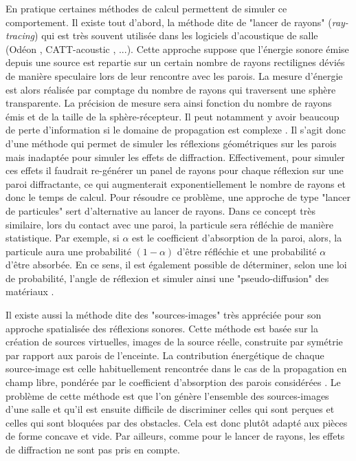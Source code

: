 En pratique certaines méthodes de calcul permettent de simuler ce comportement. Il existe tout d'abord, la méthode dite de "lancer de rayons" (\textit{ray-tracing})\cite[p.449-468]{raytracing} qui est très souvent utilisée dans les logiciels d'acoustique de salle (Odéon \cite[page web]{odeon}, CATT-acoustic \cite[page web]{catt}, ...). Cette approche suppose que l’énergie sonore émise depuis une source est repartie sur un certain nombre de rayons rectilignes déviés de manière \gls{speculaire} lors de leur rencontre avec les parois. La mesure d'énergie est alors réalisée par comptage du nombre de rayons qui traversent une sphère transparente. La précision de mesure sera ainsi fonction du nombre de rayons émis et de la taille de la sphère-récepteur. Il peut notamment y avoir beaucoup de perte d'information si le domaine de propagation est complexe \cite[p. 60]{picaut}. Il s'agit donc d'une méthode qui permet de simuler les réflexions géométriques sur les parois mais inadaptée pour simuler les effets de diffraction. Effectivement, pour simuler ces effets il faudrait re-générer un panel de rayons pour chaque réflexion sur une paroi diffractante, ce qui augmenterait exponentiellement le nombre de rayons et donc le temps de calcul. Pour résoudre ce problème, une approche de type "lancer de particules" sert d'alternative au lancer de rayons. Dans ce concept très similaire, lors du contact avec une paroi, la particule sera réfléchie de manière statistique. Par exemple, si $\alpha$ est le coefficient d'absorption de la paroi, alors, la particule aura une probabilité $(1-\alpha)$ d'être réfléchie et une probabilité $\alpha$ d'être absorbée. En ce sens, il est également possible de déterminer, selon une loi de probabilité, l'angle de réflexion et simuler ainsi une "pseudo-diffusion" des matériaux \cite[p. 62]{picaut}. %


Il existe aussi la méthode dite des "sources-images" \cite[p.6]{jouhaneau} très appréciée pour son approche spatialisée des réflexions sonores. Cette méthode est basée sur la création de sources virtuelles, images de la source réelle, construite par symétrie par rapport aux parois de l'enceinte. La contribution énergétique de chaque source-image est celle habituellement rencontrée dans le cas de la propagation en champ libre, pondérée par le coefficient d’absorption des parois considérées \cite[p. 60]{picaut}.
Le problème de cette méthode est que l'on génère l'ensemble des sources-images d'une salle et qu'il est ensuite difficile de discriminer celles qui sont perçues et celles qui sont bloquées par des obstacles. Cela est donc plutôt adapté aux pièces de forme concave et vide. Par ailleurs, comme pour le lancer de rayons, les effets de diffraction ne sont pas pris en compte. 


